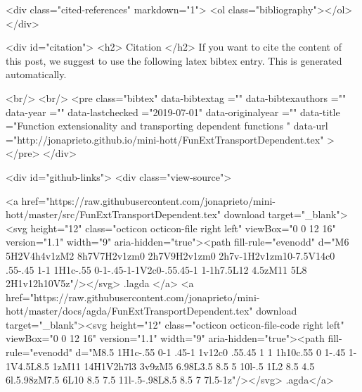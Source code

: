   <div class="cited-references" markdown="1">
  <ol class="bibliography"></ol>
  </div>


  
  <div id="citation">
  <h2> Citation </h2>
  If you want to cite the content of this post,
  we suggest to use the following latex bibtex entry.
  This is generated automatically.

  <br/>
  <br/>
  <pre class="bibtex"
       data-bibtextag =""
       data-bibtexauthors =""
       data-year =""
       data-lastchecked ="2019-07-01"
       data-originalyear =""
       data-title ="Function extensionality and transporting dependent functions "
       data-url ="http://jonaprieto.github.io/mini-hott/FunExtTransportDependent.tex"
  ></pre>
  </div>
  

  <div id="github-links">
    <div class="view-source">
      
        <a href="https://raw.githubusercontent.com/jonaprieto/mini-hott/master/src/FunExtTransportDependent.tex" download target="_blank"><svg height="12" class="octicon octicon-file right left" viewBox="0 0 12 16" version="1.1" width="9" aria-hidden="true"><path fill-rule="evenodd" d="M6 5H2V4h4v1zM2 8h7V7H2v1zm0 2h7V9H2v1zm0 2h7v-1H2v1zm10-7.5V14c0 .55-.45 1-1 1H1c-.55 0-1-.45-1-1V2c0-.55.45-1 1-1h7.5L12 4.5zM11 5L8 2H1v12h10V5z"/></svg> .lagda </a>
        <a href="https://raw.githubusercontent.com/jonaprieto/mini-hott/master/docs/agda/FunExtTransportDependent.tex" download target="_blank"><svg height="12" class="octicon octicon-file-code right left" viewBox="0 0 12 16" version="1.1" width="9" aria-hidden="true"><path fill-rule="evenodd" d="M8.5 1H1c-.55 0-1 .45-1 1v12c0 .55.45 1 1 1h10c.55 0 1-.45 1-1V4.5L8.5 1zM11 14H1V2h7l3 3v9zM5 6.98L3.5 8.5 5 10l-.5 1L2 8.5 4.5 6l.5.98zM7.5 6L10 8.5 7.5 11l-.5-.98L8.5 8.5 7 7l.5-1z"/></svg> .agda</a>
      
